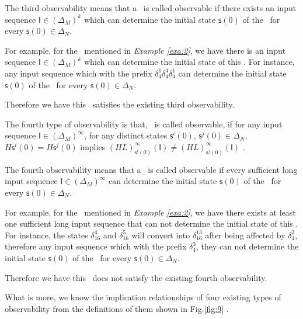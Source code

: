 The third observability means that a \BCN\ is called observable if there exists an input sequence $\mathsf{I}\in(\Delta_M)^k$ which can determine the initial state $\mathsf{s}(0)$ of the \BCN\ for every $\mathsf{s}(0)\in\Delta_N$.

\begin{example}
For example, for the \BCN\ mentioned in {\em Example \ref{exa:2}}, we have there is an input sequence $\mathsf{I}\in(\Delta_M)^k$ which can determine the initial state of this \BCN. For instance, any input sequence which with the prefix $\delta_{4}^1\delta_{4}^4\delta_{4}^1$ can determine the initial state $\mathsf{s}(0)$ of the \BCN\ for every $\mathsf{s}(0)\in\Delta_N$.

Therefore we have this \BCN\ satisfies the existing third observability.
\label{exa:6}
\end{example}  
\begin{definition}
	The fourth type of observability is that, \BCN\ is called observable, if for any input sequence $\mathsf{I}\in(\Delta_M)^{\infty}$, for any distinct states $\mathsf{s}^{i}(0)$, $\mathsf{s}^{j}(0) \in \Delta_N$, $H\mathsf{s}^{i}(0)=H\mathsf{s}^{j}(0)$ implies $(HL)^{\infty}_{\mathsf{s}^{i}(0)}(\mathsf{I})\neq (HL)^{\infty}_{\mathsf{s}^{j}(0)}(\mathsf{I})$ \cite{Fornasini2013Observability}.
\end{definition}

The fourth observability means that a \BCN\ is called observable if every sufficient long input sequence $\mathsf{I}\in(\Delta_M)^{\infty}$ can determine the initial state $\mathsf{s}(0)$ of the \BCN\ for every $\mathsf{s}(0)\in\Delta_N$.
\begin{example}
For example, for the \BCN\ mentioned in {\em Example \ref{exa:2}}, we have there exists at least one sufficient long input sequence that can not determine the initial state of this \BCN. For instance, the states $\delta_{16}^4$ and $\delta_{16}^5$  will convert into $\delta_{16}^{13}$ after being affected by $\delta_{4}^3$, therefore any input sequence which with the prefix $\delta_{4}^3$, they can not determine the initial state $\mathsf{s}(0)$ of the \BCN\ for every $\mathsf{s}(0)\in\Delta_N$.

Therefore we have this \BCN\ does not satisfy the existing fourth observability.
\label{exa:7}
\end{example}  

What is more, we know the implication relationships of four existing types of observability from the definitions of them shown in Fig.\ref{fig:9} \cite{Zhang2016Observability}. 

